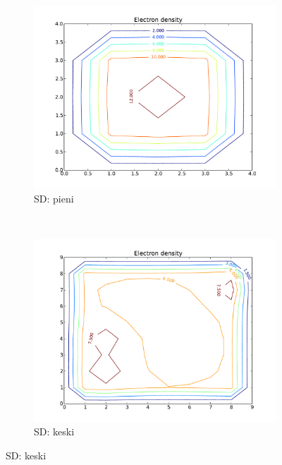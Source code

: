 \documentclass{article}
\begin{document}
\begin{figure}
        \centering
        \begin{subfigure}[b]{0.3\textwidth}
                \includegraphics[width=\textwidth]{md_pieni.pdf}
                \caption{SD: pieni}
                \label{fig:gull}
        \end{subfigure}%
        ~ %
        \begin{subfigure}[b]{0.3\textwidth}
                \includegraphics[width=\textwidth]{md_keski.pdf}
                \caption{SD: keski}
                \label{fig:tiger}
        \end{subfigure}

\end{figure}
\end{document}

